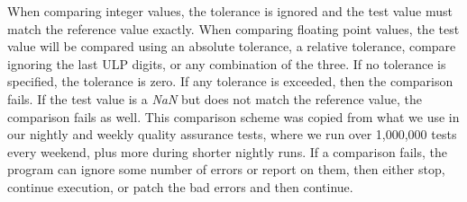 When comparing integer values, the tolerance is ignored and the test value must match the reference value exactly.
When comparing floating point values, the test value will be compared using an absolute tolerance, a relative tolerance, compare ignoring the last ULP digits, or any combination of the three.
If no tolerance is specified, the tolerance is zero.
If any tolerance is exceeded, then the comparison fails.
If the test value is a \emph{NaN} but does not match the reference value, the comparison fails as well.
This comparison scheme was copied from what we use in our nightly and weekly quality assurance tests, where we run over 1,000,000 tests every weekend, plus more during shorter nightly runs.
If a comparison fails, the program can ignore some number of errors or report on them, then either stop, continue execution, or patch the bad errors and then continue.
